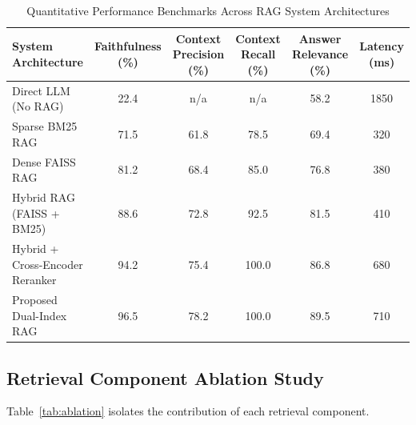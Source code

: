 \documentclass[10pt,twocolumn,letterpaper]{article}
\begin{document}
\begin{table}[t]
\caption{Quantitative Performance Benchmarks Across RAG System Architectures}
\label{tab:bench}
\centering
\footnotesize
\begin{tabular}{@{}lccccc@{}}
\toprule
\textbf{System Architecture} & \textbf{Faithfulness (\%)} & \textbf{Context Precision (\%)} & \textbf{Context Recall (\%)} & \textbf{Answer Relevance (\%)} & \textbf{Latency (ms)} \\
\midrule
Direct LLM (No RAG) & 22.4 & n/a & n/a & 58.2 & 1850 \\
Sparse BM25 RAG & 71.5 & 61.8 & 78.5 & 69.4 & 320 \\
Dense FAISS RAG & 81.2 & 68.4 & 85.0 & 76.8 & 380 \\
Hybrid RAG (FAISS + BM25) & 88.6 & 72.8 & 92.5 & 81.5 & 410 \\
Hybrid + Cross-Encoder Reranker & 94.2 & 75.4 & 100.0 & 86.8 & 680 \\
Proposed Dual-Index RAG & 96.5 & 78.2 & 100.0 & 89.5 & 710 \\
\bottomrule
\end{tabular}
\end{table}

\subsection{Retrieval Component Ablation Study}
Table~\ref{tab:ablation} isolates the contribution of each retrieval component.
\end{document}
